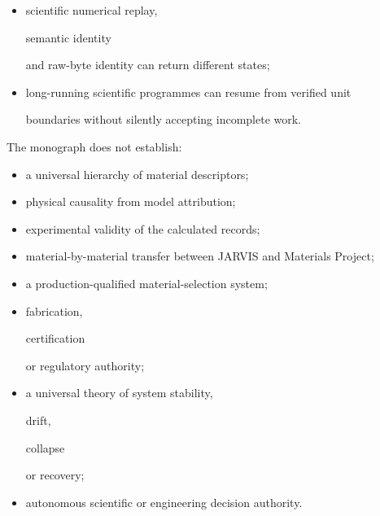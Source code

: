 \documentclass[11pt,a4paper,oneside]{report}
\begin{document}
\begin{itemize}
descriptor is necessary after retraining;



\item

scientific numerical replay,

semantic identity

and raw-byte identity can return different states;



\item

long-running scientific programmes can resume from verified unit

boundaries without silently accepting incomplete work.



\end{itemize}



The monograph does not establish:



\begin{itemize}



\item

a universal hierarchy of material descriptors;



\item

physical causality from model attribution;



\item

experimental validity of the calculated records;



\item

material-by-material transfer between JARVIS and Materials Project;



\item

a production-qualified material-selection system;



\item

fabrication,

certification

or regulatory authority;



\item

a universal theory of system stability,

drift,

collapse

or recovery;



\item

autonomous scientific or engineering decision authority.



\end{itemize}
\end{document}
